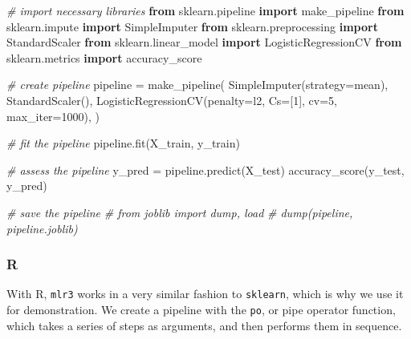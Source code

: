 \documentclass[
  letterpaper,
]{krantz}
\newenvironment{Shaded}{}{}
\newcommand{\CommentTok}[1]{\textcolor[rgb]{0.38,0.63,0.69}{\textit{#1}}}
\newcommand{\DecValTok}[1]{\textcolor[rgb]{0.25,0.63,0.44}{#1}}
\newcommand{\ImportTok}[1]{\textcolor[rgb]{0.00,0.50,0.00}{\textbf{#1}}}
\newcommand{\NormalTok}[1]{#1}
\newcommand{\OperatorTok}[1]{\textcolor[rgb]{0.40,0.40,0.40}{#1}}
\newcommand{\StringTok}[1]{\textcolor[rgb]{0.25,0.44,0.63}{#1}}
\begin{document}
\begin{Shaded}
\begin{Highlighting}[]
\CommentTok{\# import necessary libraries}
\ImportTok{from}\NormalTok{ sklearn.pipeline }\ImportTok{import}\NormalTok{ make\_pipeline}
\ImportTok{from}\NormalTok{ sklearn.impute }\ImportTok{import}\NormalTok{ SimpleImputer}
\ImportTok{from}\NormalTok{ sklearn.preprocessing }\ImportTok{import}\NormalTok{ StandardScaler}
\ImportTok{from}\NormalTok{ sklearn.linear\_model }\ImportTok{import}\NormalTok{ LogisticRegressionCV}
\ImportTok{from}\NormalTok{ sklearn.metrics }\ImportTok{import}\NormalTok{ accuracy\_score}

\CommentTok{\# create pipeline}
\NormalTok{pipeline }\OperatorTok{=}\NormalTok{ make\_pipeline(}
\NormalTok{    SimpleImputer(strategy}\OperatorTok{=}\StringTok{\textquotesingle{}mean\textquotesingle{}}\NormalTok{),}
\NormalTok{    StandardScaler(),}
\NormalTok{    LogisticRegressionCV(penalty}\OperatorTok{=}\StringTok{\textquotesingle{}l2\textquotesingle{}}\NormalTok{, Cs}\OperatorTok{=}\NormalTok{[}\DecValTok{1}\NormalTok{], cv}\OperatorTok{=}\DecValTok{5}\NormalTok{, max\_iter}\OperatorTok{=}\DecValTok{1000}\NormalTok{),}
\NormalTok{)}

\CommentTok{\# fit the pipeline}
\NormalTok{pipeline.fit(X\_train, y\_train)}

\CommentTok{\# assess the pipeline}
\NormalTok{y\_pred }\OperatorTok{=}\NormalTok{ pipeline.predict(X\_test)}
\NormalTok{accuracy\_score(y\_test, y\_pred)}

\CommentTok{\# save the pipeline}
\CommentTok{\# from joblib import dump, load}
\CommentTok{\# dump(pipeline, \textquotesingle{}pipeline.joblib\textquotesingle{})}
\end{Highlighting}
\end{Shaded}

\subsubsection{R}

With R, \texttt{mlr3} works in a very similar fashion to
\texttt{sklearn}, which is why we use it for demonstration. We create a
pipeline with the \texttt{po}, or pipe operator function, which takes a
series of steps as arguments, and then performs them in sequence.
\end{document}
